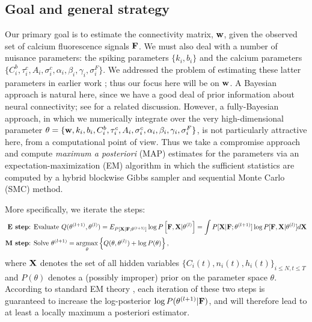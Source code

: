 \subsection{Goal and general strategy}  \label{sec:methods:goal}

Our primary goal is to estimate the connectivity matrix, $\mathbf{w}$, given
the observed set of calcium fluorescence signals ${\bf F}$.  We must
also deal with a number of nuisance parameters: the spiking parameters
$\{k_i, b_i\}$ and the calcium parameters $\{C^b_i, \tau^c_i, A_i,
\sigma^c_i, \alpha_i, \beta_i, \gamma_i, \sigma^F_i\}$.  We addressed
the problem of estimating these latter parameters in earlier work
\cite{Vogelstein2009}; thus our focus here will be on $\mathbf{w}$.  A
Bayesian approach is natural here, since we have a good deal of prior
information about neural connectivity; see \cite{Rigat06} for a
related discussion.  However, a fully-Bayesian approach, in which we
numerically integrate over the very high-dimensional parameter $\theta
= \{\mathbf{w}, k_i, b_i, C^b_i, \tau^c_i, A_i, \sigma^c_i, \alpha_i,
\beta_i, \gamma_i, \sigma^F_i\}$, is not particularly attractive here,
from a computational point of view.  Thus we take a compromise
approach and compute \emph{maximum a posteriori} (MAP) estimates for
the parameters via an expectation-maximization (EM) algorithm in which
the sufficient statistics are computed by a hybrid blockwise Gibbs
sampler and sequential Monte Carlo (SMC) method.

More specifically, we iterate the steps:
\begin{align*}
\textbf{E step} &\text{: Evaluate } Q(\bth^{(l+1)},\bth^{(l)}) =
E_{P[\bX | \bF; \bth^{(l+1)}]} \log P \left[ \bF, \bX | \bth^{(l)}
\right] = \int P[\bX | \bF; \bth^{(l+1)}] \log P[\bF, \bX | \bth^{(l)}]
d \bX \\ \textbf{M step} &\text{: Solve } \bth^{(l+1)} =
\argmax_{\bth} \left\{ Q(\bth,\bth^{(l)}) + \log P(\theta) \right\},
\end{align*}
where ${\bf X}$ denotes the set of all hidden variables $\{ C_i(t),
n_i(t), h_i(t) \}_{i \leq N, t \leq T}$ and $P(\theta)$ denotes a
(possibly improper) prior on the parameter space $\theta$.  According
to standard EM theory \cite{DLR77,McLachlanKrishnan96}, each iteration
of these two steps is guaranteed to increase the log-posterior $\log
P(\mathbf{\theta}^{(l+1)} | {\bf F})$, and will therefore lead to at least a locally
maximum a posteriori estimator.

